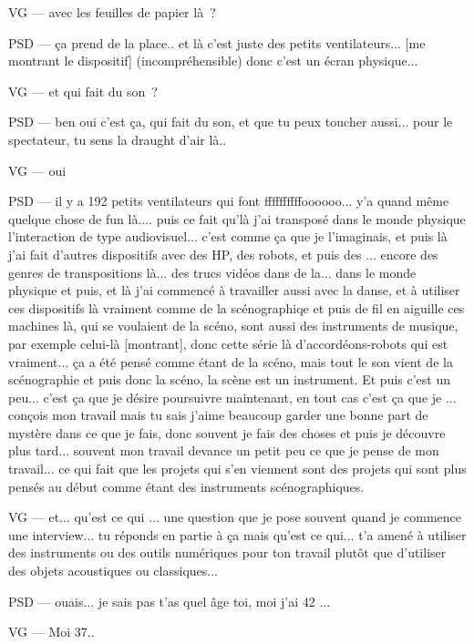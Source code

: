 VG — avec les feuilles de papier là ? 

PSD — ça prend de la place.. et là c'est juste des petits ventilateurs... [me montrant le dispositif] (incompréhensible) donc c'est un écran physique... 

VG — et qui fait du son ? 

PSD — ben oui c'est ça, qui fait du son, et que tu peux toucher aussi... pour le spectateur, tu sens la draught d'air là..   

VG — oui 

PSD — il y a 192 petits ventilateurs qui font ffffffffffoooooo... y'a quand même quelque chose de fun là.... puis ce fait qu'là j'ai transposé dans le monde physique l'interaction de type audiovisuel... c'est comme ça que je l'imaginais, et puis là j'ai fait d'autres dispositifs avec des HP, des robots, et puis des ... encore des genres de transpositions là... des trucs vidéos dans de la... dans le monde physique et puis, et là j'ai commencé à travailler aussi avec la danse, et à utiliser ces dispositifs là vraiment comme de la scénographiqe et puis de fil en aiguille ces machines là, qui se voulaient de la scéno, sont aussi des instruments de musique, par exemple celui-là [montrant], donc cette série là d'accordéons-robots qui est vraiment... ça a été pensé comme étant de la scéno, mais tout le son vient de la scénographie et puis donc la scéno, la scène est un instrument. Et puis c'est un peu... c'est ça que je désire poursuivre maintenant, en tout cas c'est ça que je ... conçois mon travail mais tu sais j'aime beaucoup garder une bonne part de mystère dans ce que je fais, donc souvent je fais des choses et puis je découvre plus tard... souvent mon travail devance un petit peu ce que je pense de mon travail... ce qui fait que les projets qui s'en viennent sont des projets qui sont plus pensés au début comme étant des instruments scénographiques. 

VG — et... qu'est ce qui ... une question que je pose souvent quand je commence une interview... tu réponds en partie à ça mais qu'est ce qui... t'a amené à utiliser des instruments ou des outils numériques pour ton travail plutôt que d'utiliser des objets acoustiques ou classiques... 

PSD — ouais... je sais pas t'as quel âge toi, moi j'ai 42 ... 

VG — Moi 37.. 

